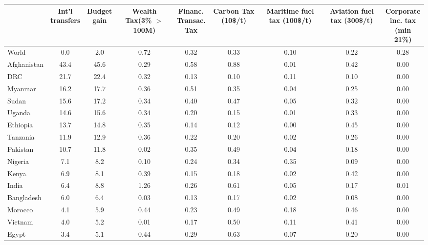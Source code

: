 
\begin{tabular}[t]{lcccccccc}
\toprule
  & \makecell{Int'l\\transfers} & \makecell{Budget\\gain} & \makecell{Wealth\\Tax(3\%\\$>$100M)} & \makecell{Financ.\\Transac.\\Tax} & \makecell{Carbon\\Tax\\(10\$/t)} & \makecell{Maritime\\fuel tax\\(100\$/t)} & \makecell{Aviation\\fuel tax\\(300\$/t)} & \makecell{Corporate\\inc. tax\\(min 21\%)}\\
\midrule
World & 0.0 & 2.0 & 0.72 & 0.32 & 0.33 & 0.10 & 0.22 & 0.28\\ \midrule
Afghanistan & 43.4 & 45.6 & 0.29 & 0.58 & 0.88 & 0.01 & 0.42 & 0.00\\
DRC & 21.7 & 22.4 & 0.32 & 0.13 & 0.10 & 0.11 & 0.10 & 0.00\\
Myanmar & 16.2 & 17.7 & 0.36 & 0.51 & 0.35 & 0.04 & 0.25 & 0.00\\
Sudan & 15.6 & 17.2 & 0.34 & 0.40 & 0.47 & 0.05 & 0.32 & 0.00\\
Uganda & 14.6 & 15.6 & 0.34 & 0.20 & 0.15 & 0.01 & 0.33 & 0.00\\
Ethiopia & 13.7 & 14.8 & 0.35 & 0.14 & 0.12 & 0.00 & 0.45 & 0.00\\
Tanzania & 11.9 & 12.9 & 0.36 & 0.22 & 0.20 & 0.02 & 0.26 & 0.00\\
Pakistan & 10.7 & 11.8 & 0.02 & 0.35 & 0.49 & 0.04 & 0.18 & 0.00\\
Nigeria & 7.1 & 8.2 & 0.10 & 0.24 & 0.34 & 0.35 & 0.09 & 0.00\\
Kenya & 6.9 & 8.1 & 0.39 & 0.15 & 0.18 & 0.02 & 0.42 & 0.00\\
India & 6.4 & 8.8 & 1.26 & 0.26 & 0.61 & 0.05 & 0.17 & 0.01\\
Bangladesh & 6.0 & 6.4 & 0.03 & 0.13 & 0.17 & 0.02 & 0.08 & 0.00\\
Morocco & 4.1 & 5.9 & 0.44 & 0.23 & 0.49 & 0.18 & 0.46 & 0.00\\
Vietnam & 4.0 & 5.2 & 0.01 & 0.17 & 0.50 & 0.11 & 0.41 & 0.00\\
Egypt & 3.4 & 5.1 & 0.44 & 0.29 & 0.63 & 0.07 & 0.20 & 0.00\\

\end{tabular}
